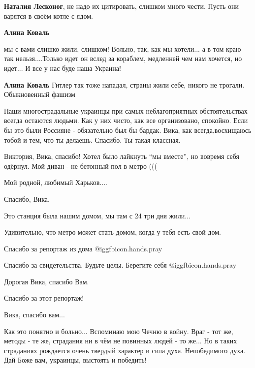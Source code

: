 \begin{itemize}
\begin{itemize}
\textbf{Наталия Лесконог}, не надо их цитировать, слишком много чести. Пусть они варятся в своём котле с ядом.

\textbf{Алина Коваль} 

мы с вами слишко жили, слишком! Вольно, так, как мы хотели... а в том краю так
нельзя....Только идет он вслед за кораблем, медленней чем нам хочется, но идет... И
все у нас буде наша Украина!

\textbf{Алина Коваль} Гитлер так тоже нападал, страны жили себе, никого не трогали. Обыкновенный фашизм
\end{itemize} %


Наши многострадальные украинцы при самых неблагоприятных обстоятельствах всегда
остаются людьми. Как у них чисто, как все организовано, спокойно. Если бы это
были Россияне - обязательно был бы бардак. Вика, как всегда,восхищаюсь тобой и
тем, что ты делаешь. Спасибо. Ты такая классная.


Виктория, Вика, спасибо! Хотел было лайкнуть \enquote{мы вместе}, но вовремя себя
одёрнул. Мой диван - не бетонный пол в метро (((

Мой родной, любимый Харьков....

Спасибо, Вика.


Это станция была нашим домом, мы там с 24 три дня жили...

Удивительно, что метро может стать домом, когда у тебя есть свой дом.

Спасибо за репортаж из дома  @igg{fbicon.hands.pray}

Спасибо за свидетельства. Будьте целы. Берегите себя  @igg{fbicon.hands.pray} 🏻 ☘

Дорогая Вика, спасибо Вам.

Спасибо за этот репортаж!

Вика, спасибо вам...


Как это понятно и больно... Вспоминаю мою Чечню в войну. Враг - тот же, методы
- те же, страдания ни в чём не повинных людей - то же... Но в таких страданиях
рождается очень твердый характер и сила духа. Непобедимого духа. Дай Боже вам,
украинцы, выстоять и победить!


\end{itemize}
